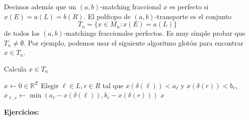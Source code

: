 \documentclass{article}
\newcommand{\RR}{\mathbb R}
\theoremstyle{plain}
\theoremstyle{definition}
\theoremstyle{Azul}
\begin{document}
Decimos además que un $(a,b)$-matching fraccional $x$ es perfecto si $x(E)=a(L)=b(R)$. El polítopo de $(a,b)$-transporte es el conjunto $$T_n=\{x\in M_n\colon x(E)=a(L)\}$$ de todos los $(a,b)$-matchings fraccionales perfectos. Es muy simple probar que $T_n\neq \emptyset$. Por ejemplo, podemos usar el siguiente algoritmo glotón para encontrar $x\in T_n$.

\begin{algorithm} %
\caption{Calcula $x\in T_n$} %
\begin{algorithmic} %
    \STATE $x\gets 0\in \RR^E$
        \STATE Elegir $\ell \in L, r\in R$ tal que $x(\delta(\ell))<a_{\ell}$ y $x(\delta(r))<b_{r}$,\\
        \STATE $x_{\ell, r}\gets \min(a_{\ell}-x(\delta(\ell)), b_{r}-x(\delta(r)))$
    \ENDWHILE   
    \RETURN $x$
    \end{algorithmic}
\end{algorithm}
\newpage
\noindent \textbf{Ejercicios:}
\end{document}

